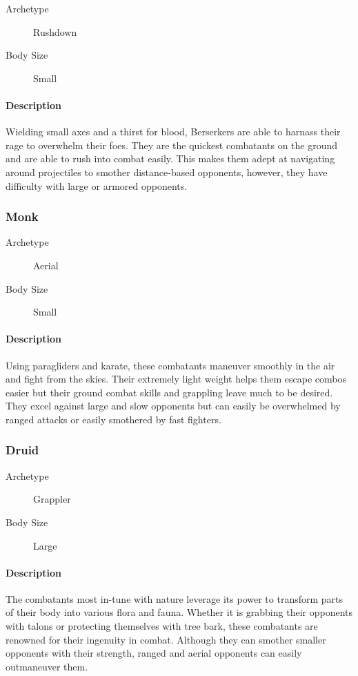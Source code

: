 \begin{description}
    \item[Archetype] Rushdown
    \item[Body Size] Small
\end{description}

\paragraph{Description} Wielding small axes and a thirst for blood, Berserkers are able to harnass their rage to overwhelm their foes. They are the quickest combatants on the ground and are able to rush into combat easily. This makes them adept at navigating around projectiles to smother distance-based opponents, however, they have difficulty with large or armored opponents.

\subsubsection{Monk}

\begin{description}
    \item[Archetype] Aerial
    \item[Body Size] Small
\end{description}

\paragraph{Description} Using paragliders and karate, these combatants maneuver smoothly in the air and fight from the skies. Their extremely light weight helps them escape combos easier but their ground combat skills and grappling leave much to be desired. They excel against large and slow opponents but can easily be overwhelmed by ranged attacks or easily smothered by fast fighters.

\subsubsection{Druid}

\begin{description}
    \item[Archetype] Grappler
    \item[Body Size] Large
\end{description}

\paragraph{Description} The combatants most in-tune with nature leverage its power to transform parts of their body into various flora and fauna. Whether it is grabbing their opponents with talons or protecting themselves with tree bark, these combatants are renowned for their ingenuity in combat. Although they can smother smaller opponents with their strength, ranged and aerial opponents can easily outmaneuver them.


